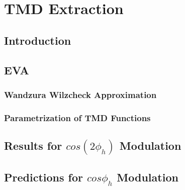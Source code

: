 \chapter{TMD Extraction}

\section{Introduction}

\section{EVA}
\subsection{Wandzura Wilzcheck Approximation}
\subsection{Parametrization of TMD Functions}
\section{Results for $cos(2\phi_h)$ Modulation}
\section{Predictions for $cos\phi_h$ Modulation}

